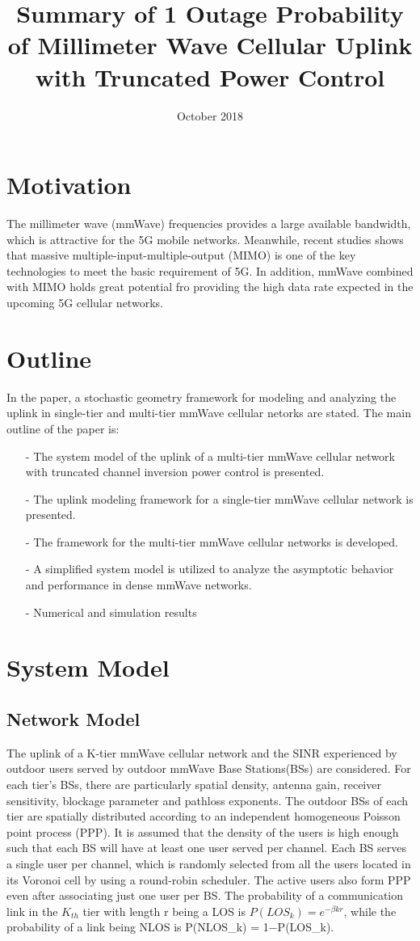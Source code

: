 \documentclass{article}
\title{Summary of 1 Outage Probability of Millimeter Wave Cellular Uplink with Truncated Power Control}
\date{October 2018}
\begin{document}
\maketitle

\section{Motivation}
The millimeter wave (mmWave) frequencies provides a large available bandwidth, which is attractive for the 5G mobile networks. Meanwhile, recent studies shows that massive multiple-input-multiple-output (MIMO) is one of the key technologies to meet the basic requirement of 5G. In addition, mmWave combined with MIMO holds great potential fro providing the high data rate expected in the upcoming 5G cellular networks.
\section{Outline}
In the paper, a stochastic geometry framework for modeling and analyzing the uplink in single-tier and multi-tier mmWave cellular netorks are stated. The main outline of the paper is:

\begin{itemize}
\item[-] The system model of the uplink of a multi-tier mmWave cellular network with truncated channel inversion power control is presented.
\item[-] The uplink modeling framework for a single-tier mmWave cellular network is presented.
\item[-] The framework for the multi-tier mmWave cellular networks is developed.
\item[-] A simplified system model is utilized to analyze the asymptotic behavior and performance in dense mmWave networks.
\item[-] Numerical and simulation results
\end{itemize}
\section{System Model}
\subsection{Network Model}
The uplink of a K-tier mmWave cellular network and the SINR experienced by outdoor users served by outdoor mmWave Base Stations(BSs) are considered. For each tier's BSs, there are particularly spatial density, antenna gain, receiver sensitivity, blockage parameter and pathloss exponents. The outdoor BSs of each tier are spatially distributed according to an independent homogeneous Poisson point process (PPP). It is assumed that the density of the users is high enough such that each BS will have at least one user served per channel. Each BS serves a single user per channel, which is randomly selected from all the users located in its Voronoi cell by using a round-robin scheduler. The active users also form PPP even after associating just one user per BS. The probability of a communication link in the $K_{th}$ tier with length r being a LOS is $P(LOS_k) = e^{-βkr}$, while the probability of a link being NLOS is P(NLOS_k) = 1−P(LOS_k).
\end{document}
